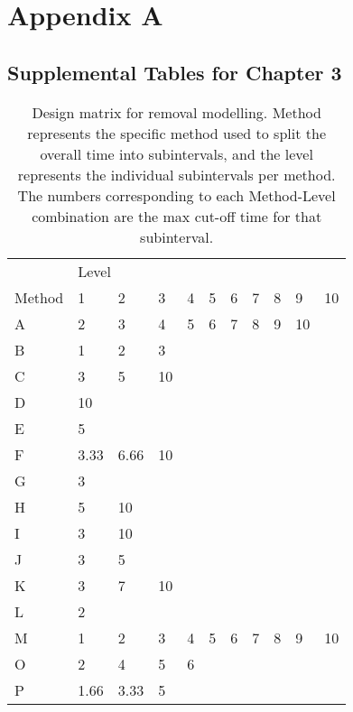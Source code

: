 \appendix
\chapter{Appendix A}
\section{Supplemental Tables for Chapter 3}

\begin{table}[]
		\caption{Design matrix for removal modelling. Method represents the specific method used to split the overall time into subintervals, and the level represents the individual subintervals per method. The numbers corresponding to each Method-Level combination are the max cut-off time for that subinterval.}
	\label{table:removal-design}
	\begin{tabular}{l|llllllllll}
		\hline
		& \multicolumn{10}{l}{Level}                      \\
		\cline{2-11}
		Method & 1    & 2    & 3  & 4  & 5 & 6 & 7 & 8 & 9  & 10 \\
		\hline
		A      & 2    & 3    & 4  & 5  & 6 & 7 & 8 & 9 & 10 &    \\
		B      & 1    & 2    & 3  &    &   &   &   &   &    &    \\
		C      & 3    & 5    & 10 &    &   &   &   &   &    &    \\
		D      & 10   &      &    &    &   &   &   &   &    &    \\
		E      & 5    &      &    &    &   &   &   &   &    &    \\
		F      & 3.33 & 6.66 & 10 &    &   &   &   &   &    &    \\
		G      & 3    &      &    &    &   &   &   &   &    &    \\
		H      & 5    & 10   &    &    &   &   &   &   &    &    \\
		I      & 3    & 10   &    &    &   &   &   &   &    &    \\
		J      & 3    & 5    &    &    &   &   &   &   &    &    \\
		K      & 3    & 7    & 10 &    &   &   &   &   &    &    \\
		L      & 2    &      &    &    &   &   &   &   &    &    \\
		M      & 1    & 2    & 3  & 4  & 5 & 6 & 7 & 8 & 9  & 10 \\
		O      & 2    & 4    & 5  & 6  &   &   &   &   &    &    \\
		P      & 1.66 & 3.33 & 5  &    &   &   &   &   &    &    \\

\end{tabular}
\end{table}
